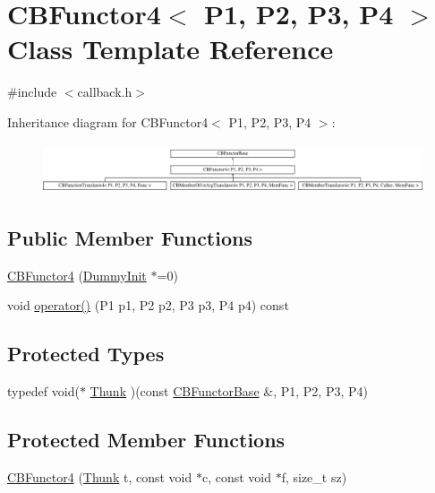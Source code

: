 \hypertarget{class_c_b_functor4}{\section{C\+B\+Functor4$<$ P1, P2, P3, P4 $>$ Class Template Reference}
\label{class_c_b_functor4}
}


{\ttfamily \#include $<$callback.\+h$>$}

Inheritance diagram for C\+B\+Functor4$<$ P1, P2, P3, P4 $>$\+:\begin{figure}[H]
\begin{center}
\leavevmode
\includegraphics[height=1.497326cm]{class_c_b_functor4}
\end{center}
\end{figure}
\subsection*{Public Member Functions}
\begin{DoxyCompactItemize}
\item 
\hyperlink{class_c_b_functor4_a01fe771031fa15bc93bd3a9755127316}{C\+B\+Functor4} (\hyperlink{class_c_b_functor_base_1_1_dummy_init}{Dummy\+Init} $\ast$=0)
\item 
void \hyperlink{class_c_b_functor4_a11b13f6aec932f356744e591b9bddb78}{operator()} (P1 p1, P2 p2, P3 p3, P4 p4) const 
\end{DoxyCompactItemize}
\subsection*{Protected Types}
\begin{DoxyCompactItemize}
\item 
typedef void($\ast$ \hyperlink{class_c_b_functor4_a50c46b1f101f8b0a903406fc3477a6a3}{Thunk} )(const \hyperlink{class_c_b_functor_base}{C\+B\+Functor\+Base} \&, P1, P2, P3, P4)
\end{DoxyCompactItemize}
\subsection*{Protected Member Functions}
\begin{DoxyCompactItemize}
\item 
\hyperlink{class_c_b_functor4_af1817f0aca71101a3242abce22892a6b}{C\+B\+Functor4} (\hyperlink{class_c_b_functor4_a50c46b1f101f8b0a903406fc3477a6a3}{Thunk} t, const void $\ast$c, const void $\ast$f, size\+\_\+t sz)
\end{DoxyCompactItemize}
